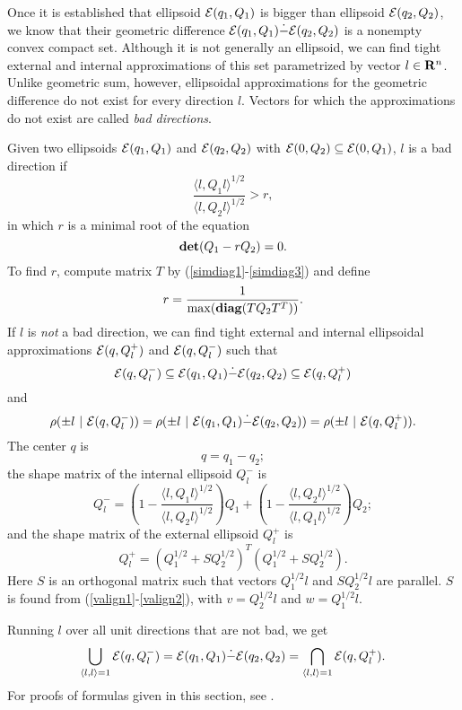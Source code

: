 Once it is established that ellipsoid $\EE(q_1,Q_1)$ is bigger than
ellipsoid $\EE(q_2,Q_2)$, we know that their geometric difference
$\EE(q_1,Q_1)\dot{-}\EE(q_2,Q_2)$ is a nonempty convex compact set.
Although  it is not generally an ellipsoid, we can find tight external
and internal approximations of this set parametrized by vector $l\in{\bf R}^n$.
Unlike geometric sum, however, ellipsoidal approximations for the geometric
difference do not exist  for every direction $l$.
Vectors for which the approximations do not exist are called
{\it bad directions}.

Given two ellipsoids $\EE(q_1,Q_1)$ and $\EE(q_2,Q_2)$ with
$\EE(0,Q_2)\subseteq\EE(0,Q_1)$, $l$ is a bad direction if
\[ \frac{\langle l,Q_1l\rangle^{1/2}}{\langle l,Q_2l\rangle^{1/2}}>r, \]
in which $r$ is a minimal root of the equation
\[ {\bf det}(Q_1-rQ_2) = 0. \]
To find $r$, compute matrix $T$ by (\ref{simdiag1}-\ref{simdiag3}) and define
\[ r = \frac{1}{\max({\bf diag}(TQ_2T^T))}. \]
If $l$ is {\it not} a bad direction, we can find tight external
and internal ellipsoidal approximations $\EE(q,Q^+_l)$ and
$\EE(q,Q^-_l)$ such that
\[ \EE(q,Q^-_l)\subseteq\EE(q_1,Q_1)\dot{-}\EE(q_2,Q_2)\subseteq\EE(q,Q^+_l) \]
and
\[ \rho(\pm l ~|~ \EE(q,Q_l^-)) =
\rho(\pm l ~|~ \EE(q_1,Q_1)\dot{-}\EE(q_2,Q_2)) =
\rho(\pm l ~|~ \EE(q,Q_l^+)).\]
The center $q$ is
\begin{equation}
q = q_1 - q_2;  \label{minkdiff_c}
\end{equation}
the shape matrix of the internal ellipsoid $Q^-_l$ is
\begin{equation}
Q^-_l = \left(1-\frac{\langle l,Q_1l\rangle^{1/2}}{\langle l,
Q_2l\rangle^{1/2}}\right)Q_1 +
\left(1 - \frac{\langle l, Q_2l\rangle^{1/2}}{\langle l,
Q_1l\rangle^{1/2}}\right)Q_2; \label{minkdiff_ia}
\end{equation}
and the shape matrix of the external ellipsoid $Q^+_l$ is
\begin{equation}
Q^+_l = \left(Q_1^{1/2} + SQ_2^{1/2}\right)^T
\left(Q_1^{1/2} + SQ_2^{1/2}\right).  \label{minkdiff_ea}
\end{equation}
Here $S$ is an orthogonal matrix such that vectors $Q_1^{1/2}l$
and $SQ_2^{1/2}l$ are parallel.
 $S$ is found from (\ref{valign1}-\ref{valign2}), with
$v=Q_2^{1/2}l$ and $w=Q_1^{1/2}l$.

Running $l$ over all unit directions that are not bad, we get
\[ \bigcup_{\langle l,l\rangle=1} \EE(q,Q_l^-) =
\EE(q_1,Q_1)\dot{-}\EE(q_2,Q_2) =
\bigcap_{\langle l,l\rangle=1} \EE(q,Q_l^+) .\]
For proofs of formulas given in this section, see \cite{kurvalyi}.









